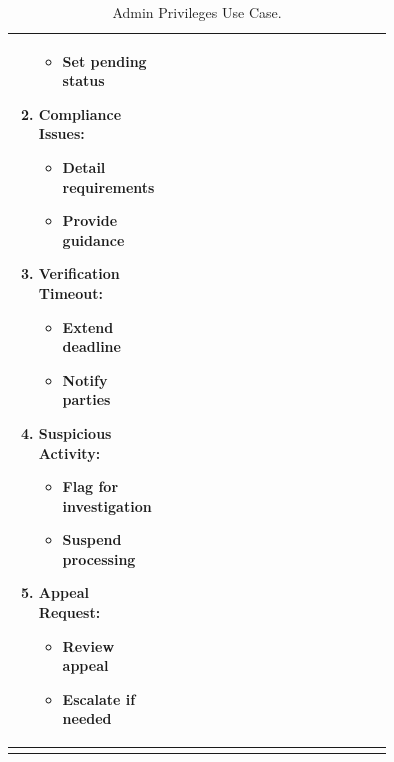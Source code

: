 \begin{longtable}{|l|p{0.75\linewidth}|}
\begin{enumerate}
\begin{itemize}
            \item Set pending status
        \end{itemize}
        \item \textbf{Compliance Issues:}
        \begin{itemize}
            \item Detail requirements
            \item Provide guidance
        \end{itemize}
        \item \textbf{Verification Timeout:}
        \begin{itemize}
            \item Extend deadline
            \item Notify parties
        \end{itemize}
        \item \textbf{Suspicious Activity:}
        \begin{itemize}
            \item Flag for investigation
            \item Suspend processing
        \end{itemize}
        \item \textbf{Appeal Request:}
        \begin{itemize}
            \item Review appeal
            \item Escalate if needed
        \end{itemize}
    \end{enumerate} \\
    \hline
    \caption{Admin Privileges Use Case.}
    \label{tab:admin_privileges_use_case}
\end{longtable}

